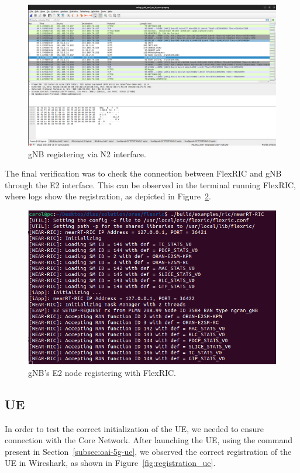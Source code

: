 \begin{figure}[H]
    \centering
    \includegraphics[width=0.8\linewidth]{figures/register_gnb}
    \caption[gNB registering via N2 interface]{gNB registering via N2 interface.}
    \label{fig:gnb_reg}
\end{figure}

The final verification was to check the connection between FlexRIC and gNB through the E2 interface.
This can be observed in the terminal running FlexRIC, where logs show the registration,  as depicted in Figure~\ref{fig:gnb_e2}.

\begin{figure}[H]
    \centering
    \includegraphics[width=0.5\linewidth]{figures/gnb_e2_flexric}
    \caption[gNB's E2 node registering with FlexRIC]{gNB's E2 node registering with FlexRIC.}
    \label{fig:gnb_e2}
\end{figure}

\subsection{UE}\label{subsec:ue}

In order to test the correct initialization of the UE, we needed to ensure connection with the Core Network.
After launching the UE, using the command present in Section~\ref{subsec:oai-5g-ue}, we observed the correct registration of the UE in Wireshark, as shown in Figure~\ref{fig:registration_ue}.

